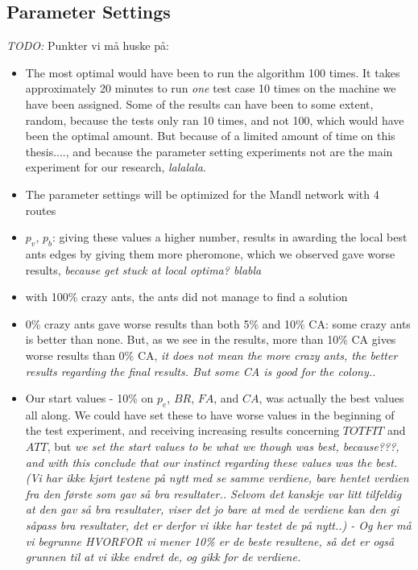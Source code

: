 \subsection{Parameter Settings}
\emph{\color{blue} TODO:}
Punkter vi må huske på:
\begin{itemize}
\item The most optimal would have been to run the algorithm 100 times. It takes approximately 20 minutes to run \textit{one} test case 10 times on the machine we have been assigned. %
Some of the results can have been to some extent, random, because the tests only ran 10 times, and not 100, which would have been the optimal amount. But because of a limited amount of time on this thesis...., and because the parameter setting experiments not are the main experiment for our research, \emph{\color{blue} lalalala}. 
\item The parameter settings will be optimized for the Mandl network with 4 routes
\item $p_v$, $p_b$: giving these values a higher number, results in awarding the local best ants edges by giving them more pheromone, which we observed gave worse results, \emph{\color{blue}because get stuck at local optima? blabla}
\item with 100\% crazy ants, the ants did not manage to find a solution 
\item 0\% crazy ants gave worse results than both 5\% and 10\% CA: some crazy ants is better than none. But, as we see in the results, more than 10\% CA gives worse results than 0\% CA, \emph{\color{blue} it does not mean the more crazy ants, the better results regarding the final results. But some CA is good for the colony..}
\item Our start values - 10\% on $p_e$, $BR$, $FA$, and $CA$, was actually the best values all along. We could have set these to have worse values in the beginning of the test experiment, and receiving increasing results concerning $TOTFIT$ and $ATT$, but \emph{\color{blue} we set the start values to be what we though was best, because???, and with this conclude that our instinct regarding these values was the best. (Vi har ikke kjørt testene på nytt med se samme verdiene, bare hentet verdien fra den første som gav så bra resultater.. Selvom det kanskje var litt tilfeldig at den gav så bra resultater, viser det jo bare at med de verdiene kan den gi såpass bra resultater, det er derfor vi ikke har testet de på nytt..) - Og her må vi begrunne HVORFOR vi mener 10\% er de beste resultene, så det er også grunnen til at vi ikke endret de, og gikk for de verdiene.}

\end{itemize}
